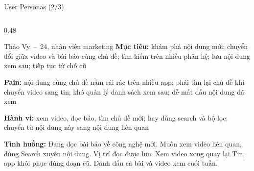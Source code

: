 \begin{frame}{User Personas (2/3)}
\begin{columns}[T]
\begin{column}{0.48\textwidth}
\begin{block}{\small Thảo Vy~--~24, nhân viên marketing}
{\tiny\textbf{Mục tiêu:} khám phá nội dung mới; chuyển đổi giữa video và bài báo cùng chủ đề; tìm kiếm trên nhiều phân hệ; lưu nội dung xem sau; tiếp tục từ chỗ cũ}\par\vspace{0.4mm}
{\tiny\textbf{Pain:} nội dung cùng chủ đề nằm rải rác trên nhiều app; phải tìm lại chủ đề khi chuyển video sang tin; khó quản lý danh sách xem sau; dễ mất dấu nội dung đã xem}\par\vspace{0.4mm}
{\tiny\textbf{Hành vi:} xem video, đọc báo, tìm chủ đề mới; hay dùng search và bộ lọc; chuyển từ nội dung này sang nội dung liên quan}\par\vspace{0.4mm}
{\tiny\textbf{Tình huống:} Đang đọc bài báo về công nghệ mới. Muốn xem video liên quan, dùng Search xuyên nội dung. Vị trí đọc được lưu. Xem video xong quay lại Tin, app khôi phục đúng đoạn cũ. Đánh dấu cả bài và video xem cuối tuần.}
\end{block}
\end{column}
\end{columns}
\end{frame}

